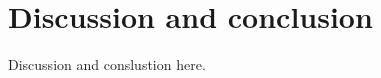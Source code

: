 
\chapter{Discussion and conclusion}\label{chapter:discussion_conclusion}
Discussion and conslustion here.